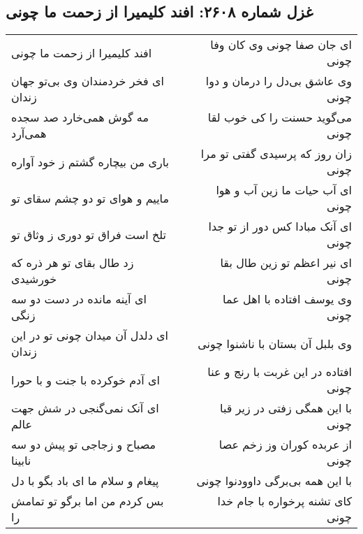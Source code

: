 \begin{center}
\section*{غزل شماره ۲۶۰۸: افند کلیمیرا از زحمت ما چونی}
\label{sec:2608}
\begin{longtable}{l p{0.5cm} r}
افند کلیمیرا از زحمت ما چونی
&&
ای جان صفا چونی وی کان وفا چونی
\\
ای فخر خردمندان وی بی‌تو جهان زندان
&&
وی عاشق بی‌دل را درمان و دوا چونی
\\
مه گوش همی‌خارد صد سجده همی‌آرد
&&
می‌گوید حسنت را کی خوب لقا چونی
\\
باری من بیچاره گشتم ز خود آواره
&&
زان روز که پرسیدی گفتی تو مرا چونی
\\
ماییم و هوای تو دو چشم سقای تو
&&
ای آب حیات ما زین آب و هوا چونی
\\
تلخ است فراق تو دوری ز وثاق تو
&&
ای آنک مبادا کس دور از تو جدا چونی
\\
زد طال بقای تو هر ذره که خورشیدی
&&
ای نیر اعظم تو زین طال بقا چونی
\\
ای آینه مانده در دست دو سه زنگی
&&
وی یوسف افتاده با اهل عما چونی
\\
ای دلدل آن میدان چونی تو در این زندان
&&
وی بلبل آن بستان با ناشنوا چونی
\\
ای آدم خوکرده با جنت و با حورا
&&
افتاده در این غربت با رنج و عنا چونی
\\
ای آنک نمی‌گنجی در شش جهت عالم
&&
با این همگی زفتی در زیر قبا چونی
\\
مصباح و زجاجی تو پیش دو سه نابینا
&&
از عربده کوران وز زخم عصا چونی
\\
پیغام و سلام ما ای باد بگو با دل
&&
با این همه بی‌برگی داوودنوا چونی
\\
بس کردم من اما برگو تو تمامش را
&&
کای تشنه پرخواره با جام خدا چونی
\\
\end{longtable}
\end{center}
